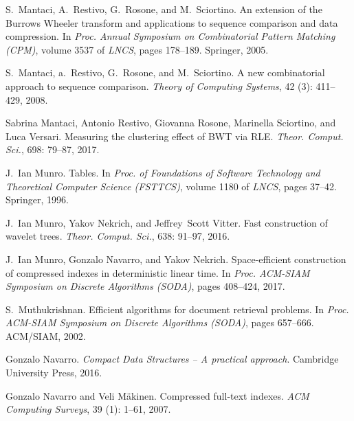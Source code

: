 \documentclass{elsarticle}
\begin{document}
\begin{thebibliography}{35}
S.~Mantaci, A.~Restivo, G.~Rosone, and M.~Sciortino.
\newblock An extension of the {Burrows Wheeler} transform and applications to
  sequence comparison and data compression.
\newblock In \emph{Proc. Annual Symposium on Combinatorial Pattern Matching
  (CPM)}, volume 3537 of \emph{LNCS}, pages 178--189. Springer, 2005.

S.~Mantaci, a.~Restivo, G.~Rosone, and M.~Sciortino.
\newblock A new combinatorial approach to sequence comparison.
\newblock \emph{Theory of Computing Systems}, 42 (3):
  411--429, 2008.

Sabrina Mantaci, Antonio Restivo, Giovanna Rosone, Marinella Sciortino, and
  Luca Versari.
\newblock Measuring the clustering effect of {BWT} via {RLE}.
\newblock \emph{Theor. Comput. Sci.}, 698: 79--87, 2017.

J.~Ian Munro.
\newblock Tables.
\newblock In \emph{Proc. of Foundations of Software Technology and Theoretical
  Computer Science (FSTTCS)}, volume 1180 of \emph{LNCS}, pages 37--42.
  Springer, 1996.

J.~Ian Munro, Yakov Nekrich, and Jeffrey~Scott Vitter.
\newblock Fast construction of wavelet trees.
\newblock \emph{Theor. Comput. Sci.}, 638: 91--97, 2016.

J.~Ian Munro, Gonzalo Navarro, and Yakov Nekrich.
\newblock Space-efficient construction of compressed indexes in deterministic
  linear time.
\newblock In \emph{Proc. ACM-SIAM Symposium on Discrete Algorithms (SODA)},
  pages 408--424, 2017.

S.~Muthukrishnan.
\newblock Efficient algorithms for document retrieval problems.
\newblock In \emph{Proc. ACM-SIAM Symposium on Discrete Algorithms (SODA)},
  pages 657--666. {ACM/SIAM}, 2002.

Gonzalo Navarro.
\newblock \emph{Compact Data Structures -- A practical approach}.
\newblock Cambridge University Press, 2016.

Gonzalo Navarro and Veli M\"{a}kinen.
\newblock Compressed full-text indexes.
\newblock \emph{ACM Computing Surveys}, 39 (1): 1--61, 2007.


\end{thebibliography}
\end{document}
